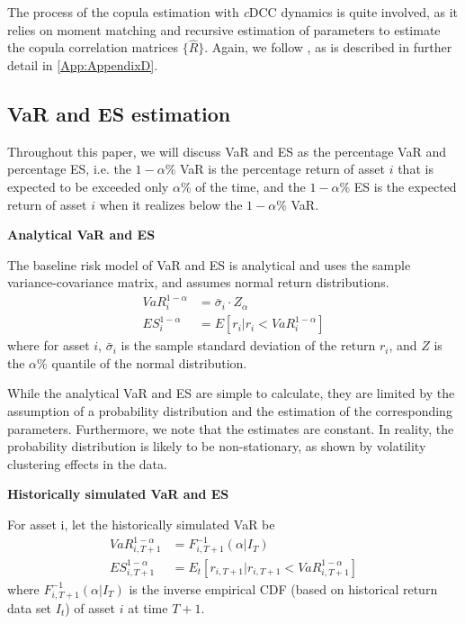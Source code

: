 The process of the copula estimation with \textit{c}DCC dynamics is quite involved, as it relies on moment matching and recursive estimation of parameters to estimate the copula correlation matrices $\{\hat{R}\}$. Again, we follow \textcite{Aielli2013}, as is described in further detail in \autoref{App:AppendixD}.

\subsection{VaR and ES estimation}
Throughout this paper, we will discuss VaR and ES as the percentage VaR and percentage ES, i.e. the $1-\alpha \%$ VaR is the percentage return of asset $i$ that is expected to be exceeded only $\alpha \%$ of the time, and the $1 -\alpha \%$ ES is the expected return of asset $i$ when it realizes below the $1 - \alpha \%$ VaR. 

\textbf{Analytical VaR and ES}

The baseline risk model of VaR and ES is analytical and uses the sample variance-covariance matrix, and assumes normal return distributions.
\begin{align}
    VaR_i^{1-\alpha} &= \bar{\sigma}_i \cdot Z_{\alpha} \\
    ES_i^{1-\alpha} &= E[r_i | r_i < VaR_i^{1-\alpha}]
\end{align}
where for asset $i$, $\bar{\sigma}_i$ is the sample standard deviation of the return $r_i$, and $Z$ is the $\alpha \%$ quantile of the normal distribution.

While the analytical VaR and ES are simple to calculate, they are limited by the assumption of a probability distribution and the estimation of the corresponding parameters. Furthermore, we note that the estimates are constant. In reality, the probability distribution is likely to be non-stationary, as shown by volatility clustering effects in the data.

\textbf{Historically simulated VaR and ES}

For asset i, let the historically simulated VaR be
\begin{align}
    VaR_{i,T+1}^{1-\alpha} &= F_{i, T+1}^{-1}(\alpha | I_T) \\
    ES_{i, T+1}^{1 - \alpha} &= E_t[r_{i,T+1} | r_{i,T+1} < VaR_{i,T+1}^{1-\alpha}]
\end{align}
where $F_{i, T+1}^{-1}(\alpha | I_T)$ is the inverse empirical CDF (based on historical return data set $I_t$) of asset $i$ at time $T+1$.

